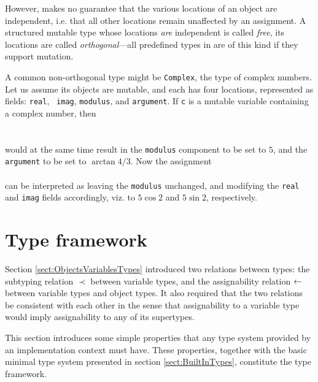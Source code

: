 
However, \Cal makes no guarantee that
the various locations of an object are independent, i.e. that all
other locations remain unaffected by an assignment. A structured
mutable type whose locations {\em are} independent is called
 {\em free}, its locations are called {\em
  orthogonal}---all predefined types in \Cal are of this kind if they
support mutation.

\begin{example}A common non-orthogonal type might be {\tt Complex},
  the type of complex numbers. Let us assume its objects are mutable,
  and each has four locations, represented as fields: {\tt real}, {\tt
    imag}, {\tt modulus}, and {\tt argument}. If {\tt c} is a mutable
  variable containing a complex number, then\\
\\
\\
would at the same time result in the {\tt modulus} component to be set
to $5$, and the {\tt argument} to be set to $\arctan 4/3$. Now the assignment\\
\\
can be interpreted as leaving the {\tt modulus} unchanged, and
modifying the {\tt real} and {\tt imag} fields accordingly, viz. to $5
\cos 2$ and $5 \sin 2$, respectively.
\end{example}





\section{Type framework}\label{sect:TypeFramework}

Section \ref{sect:ObjectsVariablesTypes} introduced two
relations between types: the subtyping relation $\prec$ between variable
types, and the assignability relation $\leftarrow$ between
variable types and object types. It also required that the two
relations be consistent with each other in the sense that
assignability to a variable type would imply assignability to any of
its supertypes.

This section introduces some simple properties that any type system
provided by an implementation context must have. These properties,
together with the basic minimal type system presented in section
\ref{sect:BuiltInTypes}, constitute the \Cal type framework.

